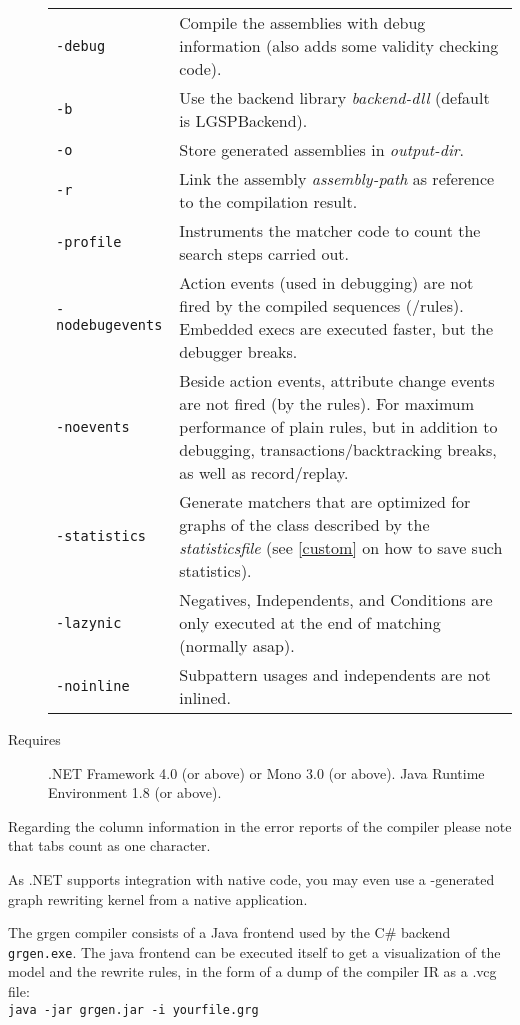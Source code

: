 \begin{description}
\begin{tabularx}{\linewidth}{lX}
      \texttt{-debug} & Compile the assemblies with debug information (also adds some validity checking code).\\
      \texttt{-b} & Use the backend library \emph{backend-dll} (default is LGSPBackend).\\
      \texttt{-o} & Store generated assemblies in \emph{output-dir}.\\
      \texttt{-r} & Link the assembly \emph{assembly-path} as reference to the compilation result.\\
      \texttt{-profile} & Instruments the matcher code to count the search steps carried out.\\
      \texttt{-nodebugevents} & Action events (used in debugging) are not fired by the compiled sequences (/rules). Embedded execs are executed faster, but the debugger breaks.\\
      \texttt{-noevents} & Beside action events, attribute change events are not fired (by the rules). For maximum performance of plain rules, but in addition to debugging, transactions/backtracking breaks, as well as record/replay.\\
      \texttt{-statistics} & Generate matchers that are optimized for graphs of the class described by the \emph{statisticsfile} (see \ref{custom} on how to save such statistics).\\
      \texttt{-lazynic} & Negatives, Independents, and Conditions are only executed at the end of matching (normally asap).\\
      \texttt{-noinline} & Subpattern usages and independents are not inlined.\\
    \end{tabularx}
  \item[Requires] .NET Framework 4.0 (or above) or Mono 3.0 (or above). Java Runtime Environment 1.8 (or above).
\end{description}

\begin{note}
Regarding the column information in the error reports of the compiler please note that tabs count as one character.
\end{note}

\begin{note}
As .NET supports integration with native code, you may even use a \GrG-generated graph rewriting kernel from a native application.
\end{note}

\begin{note}\label{note:modelruledump}
The grgen compiler consists of a Java frontend used by the C\# backend \texttt{grgen.exe}.
The java frontend can be executed itself to get a visualization of the model and the rewrite rules,
in the form of a dump of the compiler IR as a .vcg file:\\
\texttt{java -jar grgen.jar -i yourfile.grg}
\end{note}

